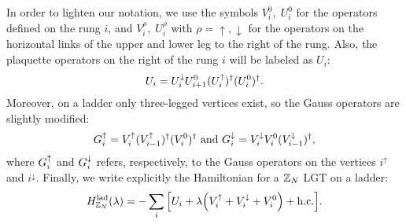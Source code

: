 In order to lighten our notation,
we use the symbols $V^0_i, \; U^0_i$ for the operators defined on the rung $i$, and  $V^{\rho}_i, \; U^{\rho}_i$ with $\rho = \uparrow, \downarrow$ for the operators on the horizontal links of the upper and lower leg to the right of the rung.
Also, the plaquette operators on the right of the rung $i$ will be labeled as $U_i$:
\begin{equation}
    U_i = U^{\downarrow}_i U^0_{i+1} (U^{\uparrow}_i)^{\dagger} (U^0_i)^{\dagger}.
    \label{eq:plaq_op_ladder}
\end{equation}
Moreover, on a ladder only three-legged vertices exist, so the Gauss operators are slightly modified:
\begin{equation}
    G^{\uparrow}_i
    = V^{\uparrow}_i ( V^{\uparrow}_{i-1} )^\dagger ( V^0_i )^\dagger \text{~and~}
    G^{\downarrow}_i
    = V^{\downarrow}_i V^0_i ( V^{\downarrow}_{i-1} )^\dagger,
    \label{eq:gauss_law_ladder}
\end{equation}
where $G^{\uparrow}_i$ and $G^{\downarrow}_i$ refers, respectively, to the Gauss operators on the vertices $i^{\uparrow}$ and $i^{\downarrow}$.
Finally, we write explicitly the Hamiltonian for a $\mathbb{Z}_N$ LGT on a ladder:
\begin{equation}
    H_{\Z_N}^{\text{lad}}(\lambda) =
    - \sum_{i} \bqty{ U_i + \lambda \pqty{ \Vup_i + \Vdown_i + V^0_i } + \text{h.c.} }.
    \label{eq:ladder_hamiltonian}
\end{equation}


